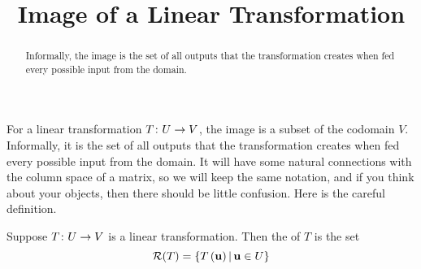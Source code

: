 \documentclass{ximera}
\title{Image of a Linear Transformation}
\begin{document}
\begin{abstract}
  Informally, the image is the set of all outputs that the transformation creates when fed every possible input from the domain.
\end{abstract}
\maketitle

For a linear transformation $T\colon U\rightarrow V$, the image is a subset of the codomain $V$.  Informally, it is the set of all outputs that the transformation creates when fed every possible input from the domain.  It will have some natural connections with the column space of a matrix, so we will keep the same notation, and if you think about your objects, then there should be little confusion.  Here is the careful definition.

\begin{definition}

Suppose $T\colon U\rightarrow V$ is a linear transformation.  Then the  of $T$ is the set
\[
\mathcal{R}\!\left(T\right)=\left\lbrace T\left(\mathbf{u}\right)\,\middle|\,\mathbf{u}\in U\right\rbrace
\]
\end{definition}
\end{document}
